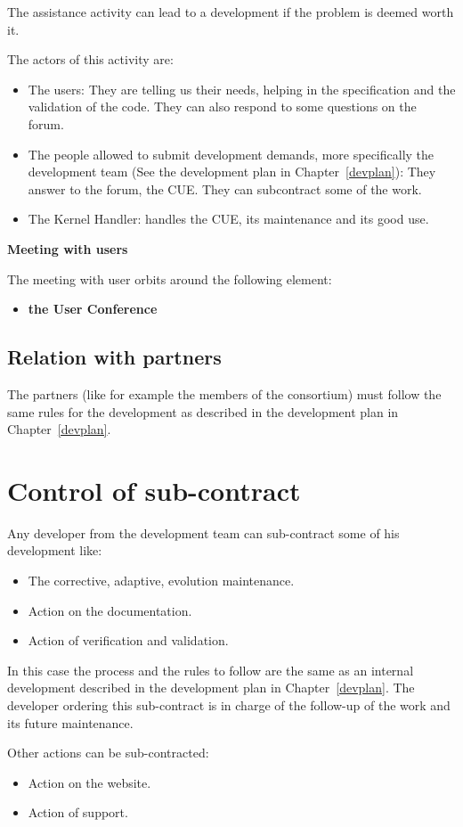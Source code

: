 The assistance activity can lead to a development if the problem is deemed
worth it.

The actors of this activity are:
\begin{itemize}
\item The users: They are telling us their needs, helping in the specification
  and the validation of the code. They can also respond to some questions on
  the forum.
\item The people allowed to submit development demands, more specifically the
  development team (See the development plan in Chapter~\ref{devplan}): They
  answer to the forum, the CUE\@. They can subcontract some of the work.
\item The Kernel Handler: handles the CUE, its maintenance and its good use.
\end{itemize}

\textbf{Meeting with users}

The meeting with user orbits around the following element:
\begin{itemize}
  \item \textbf{the \telemacsystem{} User Conference}
\end{itemize}

\subsection{Relation with partners}

The partners (like for example the members of the \telemacsystem{} consortium)
must follow the same rules for the development as described in the development
plan in Chapter~\ref{devplan}.

\section{Control of sub-contract}

Any developer from the development team can sub-contract some of his
development like:
\begin{itemize}
\item The corrective, adaptive, evolution maintenance.
\item Action on the documentation.
\item Action of verification and validation.
\end{itemize}

In this case the process and the rules to follow are the same as an internal
development described in the development plan in Chapter~\ref{devplan}. The
developer ordering this sub-contract is in charge of the follow-up of the work
and its future maintenance.

Other actions can be sub-contracted:
\begin{itemize}
\item Action on the website.
\item Action of support.
\end{itemize}
